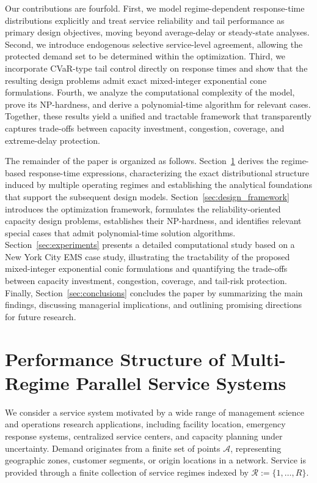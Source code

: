 \documentclass[letter,11pt, reqno]{amsart}
\begin{document}
Our contributions are fourfold.
First, we model regime-dependent response-time distributions explicitly
and treat service reliability and tail performance as primary design
objectives, moving beyond average-delay or steady-state analyses.
Second, we introduce endogenous selective service-level agreement,
allowing the protected demand set to be determined within the
optimization.
Third, we incorporate CVaR-type tail control directly on response times
and show that the resulting design problems admit exact
mixed-integer exponential cone formulations.
Fourth, we analyze the computational complexity of the model,
prove its NP-hardness, and derive a
polynomial-time algorithm for relevant cases.
Together, these results yield a unified and tractable framework that
transparently captures trade-offs between capacity investment,
congestion, coverage, and extreme-delay protection.

The remainder of the paper is organized as follows.
Section~\ref{sec:performance_structure} derives the regime-based response-time expressions, characterizing the exact distributional structure induced by multiple operating regimes and establishing the analytical foundations that support the subsequent design models.
Section~\ref{sec:design_framework} introduces the optimization framework, formulates the reliability-oriented capacity design problems, establishes their NP-hardness, and identifies relevant special cases that admit polynomial-time solution algorithms.
Section~\ref{sec:experiments} presents a detailed computational study based on a New York City EMS case study, illustrating the tractability of the proposed mixed-integer exponential conic formulations and quantifying the trade-offs between capacity investment, congestion, coverage, and tail-risk protection.
Finally, Section~\ref{sec:conclusions} concludes the paper by summarizing the main findings, discussing managerial implications, and outlining promising directions for future research.

\section{Performance Structure of Multi-Regime Parallel Service Systems}
\label{sec:performance_structure}

We consider a service system motivated by a wide range of management science and
operations research applications, including facility location, emergency response
systems, centralized service centers, and capacity planning under uncertainty.
Demand originates from a finite set of points $\mathcal{A}$, representing
geographic zones, customer segments, or origin locations in a network. Service is
provided through a finite collection of service regimes indexed by
$\mathcal{R}:=\{1,\ldots,R\}$.
\end{document}

